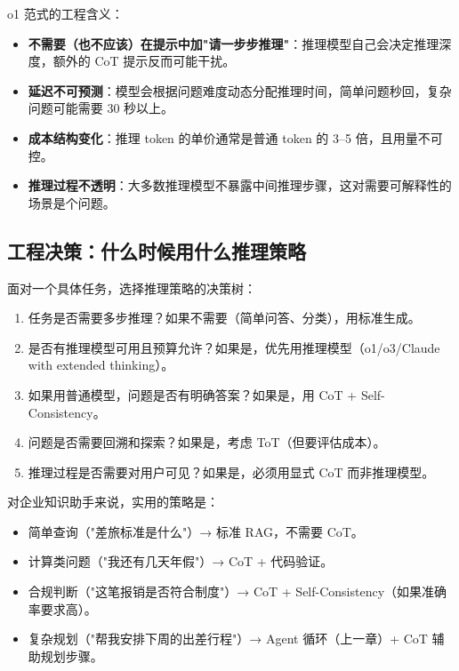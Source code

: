 o1 范式的工程含义：

\begin{itemize}
  \item \textbf{不需要（也不应该）在提示中加"请一步步推理"}：推理模型自己会决定推理深度，额外的 CoT 提示反而可能干扰。
  \item \textbf{延迟不可预测}：模型会根据问题难度动态分配推理时间，简单问题秒回，复杂问题可能需要 30 秒以上。
  \item \textbf{成本结构变化}：推理 token 的单价通常是普通 token 的 3--5 倍，且用量不可控。
  \item \textbf{推理过程不透明}：大多数推理模型不暴露中间推理步骤，这对需要可解释性的场景是个问题。
\end{itemize}

\subsection{工程决策：什么时候用什么推理策略}
面对一个具体任务，选择推理策略的决策树：

\begin{enumerate}
  \item 任务是否需要多步推理？如果不需要（简单问答、分类），用标准生成。
  \item 是否有推理模型可用且预算允许？如果是，优先用推理模型（o1/o3/Claude with extended thinking）。
  \item 如果用普通模型，问题是否有明确答案？如果是，用 CoT + Self-Consistency。
  \item 问题是否需要回溯和探索？如果是，考虑 ToT（但要评估成本）。
  \item 推理过程是否需要对用户可见？如果是，必须用显式 CoT 而非推理模型。
\end{enumerate}

对企业知识助手来说，实用的策略是：
\begin{itemize}
  \item 简单查询（"差旅标准是什么"）→ 标准 RAG，不需要 CoT。
  \item 计算类问题（"我还有几天年假"）→ CoT + 代码验证。
  \item 合规判断（"这笔报销是否符合制度"）→ CoT + Self-Consistency（如果准确率要求高）。
  \item 复杂规划（"帮我安排下周的出差行程"）→ Agent 循环（上一章）+ CoT 辅助规划步骤。
\end{itemize}

